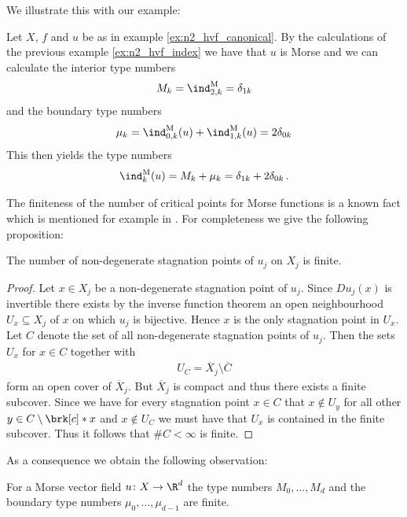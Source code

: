 We illustrate this with our example:
\begin{example}
  Let $X$, $f$ and $u$ be as in example \ref{ex:n2_hvf_canonical}. By the calculations of the previous example
  \ref{ex:n2_hvf_index} we have that $u$ is Morse and we can calculate the interior type numbers
  \begin{align*}
    M_k=\ind^\text{M}_{2,k}=\delta_{1k}
  \end{align*}
  and the boundary type numbers
  \begin{align*}
    \mu_k=\ind^\text{M}_{0,k}(u)+\ind^\text{M}_{1,k}(u)=2\delta_{0k}\\
  \end{align*}
  This then yields the type numbers
  \begin{align*}
    \ind^\text{M}_k(u)=M_k+\mu_k=\delta_{1k}+2\delta_{0k}\,.
  \end{align*}
\end{example}

The finiteness of the number of critical points for Morse functions is a known fact which is mentioned
for example in \cite{Morse1970}. For completeness we give the following proposition:
\begin{proposition}\label{pr:finiteness_critical_points}
  The number of non-degenerate
  stagnation points of $u_j$ on $X_j$ is finite.
\end{proposition}
\begin{proof}
  Let $x\in X_j$ be a non-degenerate stagnation point of $u_j$. Since $Du_j(x)$ is invertible there exists
  by the inverse function theorem an open neighbourhood $U_x\subseteq X_j$ of $x$ on which 
  $u_j$ is bijective. Hence $x$ is the only stagnation point in $U_x$. Let $C$ denote the set of all
  non-degenerate stagnation points of $u_j$. Then the sets $U_x$ for $x\in C$ together with
  \begin{align}
    U_C=\overline{X}_j\setminus \overline{C}
  \end{align}
  form an open cover of $\overline{X}_j$. But $\overline{X}_j$ is compact and thus there exists
  a finite subcover. Since we have for every stagnation point $x\in C$ that
  $x\not\in U_y$ for all other $y\in C\setminus\brk[c]*{x}$ and $x\not\in U_C$ we must have that $U_x$
  is contained in the finite subcover. Thus it follows that $\#C<\infty$ is finite.
\end{proof}
As a consequence we obtain the following observation:
\begin{corollary}\label{co:finiteness_type_nbrs}
  For a Morse vector field $u\colon X\to\R^d$ the type numbers $M_0,\dots,M_d$ and the boundary type numbers $\mu_0,\dots,\mu_{d-1}$
  are finite.
\end{corollary}

